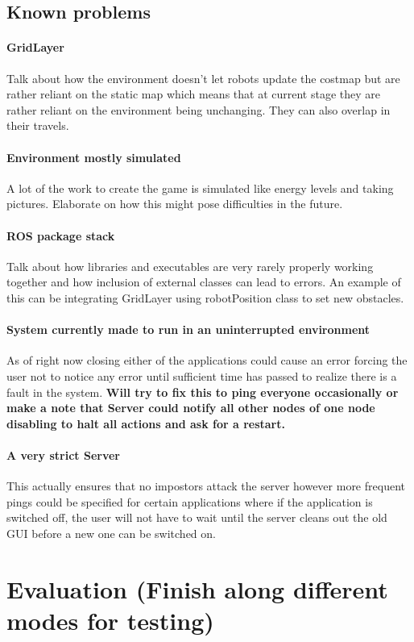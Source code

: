 \documentclass{report}
\begin{document}
    \section{Known problems}
      \subsubsection{GridLayer}
        Talk about how the environment doesn't let robots update the costmap but are rather reliant on the static map which means that at current stage they are rather reliant on the environment being unchanging. They can also overlap in their travels.
      \subsubsection{Environment mostly simulated}
        A lot of the work to create the game is simulated like energy levels and taking pictures. Elaborate on how this might pose difficulties in the future.
      \subsubsection{ROS package stack}
        Talk about how libraries and executables are very rarely properly working together and how inclusion of external classes can lead to errors. An example of this can be integrating GridLayer using robotPosition class to set new obstacles.
      \subsubsection{System currently made to run in an uninterrupted environment}
        As of right now closing either of the applications could cause an error forcing the user not to notice any error until sufficient time has passed to realize there is a fault in the system. \textbf{Will try to fix this to ping everyone occasionally or make a note that Server could notify all other nodes of one node disabling to halt all actions and ask for a restart.}
      \subsubsection{A very strict Server}
        This actually ensures that no impostors attack the server however more frequent pings could be specified for certain applications where if the application is switched off, the user will not have to wait until the server cleans out the old GUI before a new one can be switched on.
  \chapter{Evaluation (Finish along different modes for testing)}
\end{document}
